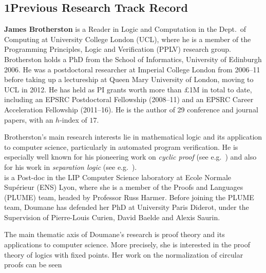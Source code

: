 \documentclass[11pt,twocolumn]{article}
\begin{document}


\begin{abstract}
  
\end{abstract}

\subsection*{1\quad Previous Research Track Record}

{\bf James Brotherston} is a Reader in Logic and Computation in the Dept.\ of Computing at University College London (UCL), where he is a member of the Programming Principles, Logic and Verification (PPLV) research group.  Brotherston holds a PhD from the School of Informatics, University of Edinburgh 2006.  He was a postdoctoral researcher at Imperial College London from 2006--11 before taking up a lectureship at Queen Mary University of London, moving to UCL in 2012. He has held as PI grants worth more than $\pounds$1M in total to date, including an EPSRC Postdoctoral Fellowship (2008--11) and an EPSRC Career Acceleration Fellowship (2011--16). He is the author of 29 conference and journal papers, with an $h$-index of $17$.

Brotherston's main research interests lie in mathematical logic and its application to computer science, particularly in automated program verification. He is especially well known for his pioneering work on \emph{cyclic proof} (see e.g.~) and also for his work in \emph{separation logic} (see e.g.~).  \\

  is a Post-doc in the
LIP Computer Science laboratory at Ecole Normale
Supérieur (ENS) Lyon, where she is a member of the
Proofs and Languages (PLUME) team, headed by Professor
Russ Harmer. Before joining the PLUME team,
Doumane has defended her PhD at University Paris Diderot,
under the Supervision of Pierre-Louis Curien, David
Baelde and Alexis Saurin.

The main thematic axis of Doumane's research is proof theory and its
applications to computer science.  More precisely, she is interested in the proof theory of logics with fixed points. Her work on the normalization of circular proofs can be seen 
\end{document}
